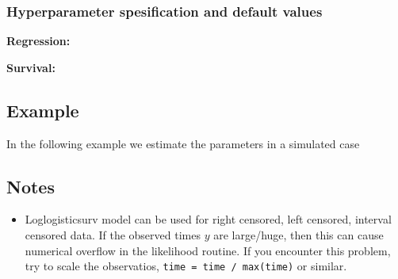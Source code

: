 \documentclass[a4paper,11pt]{article}
\begin{document}
\subsubsection*{Hyperparameter spesification and default values}
\textbf{Regression:} 

\textbf{Survival:} 


\subsection*{Example}

In the following example we estimate the parameters in a simulated
case 

\subsection*{Notes}

\begin{itemize}
\item Loglogisticsurv model can be used for right censored, left
    censored, interval censored data. If the observed times $y$ are
    large/huge, then this can cause numerical overflow in the
    likelihood routine. If you encounter this problem, try to scale
    the observatios, \verb|time = time / max(time)| or similar.
\end{itemize}
\end{document}
